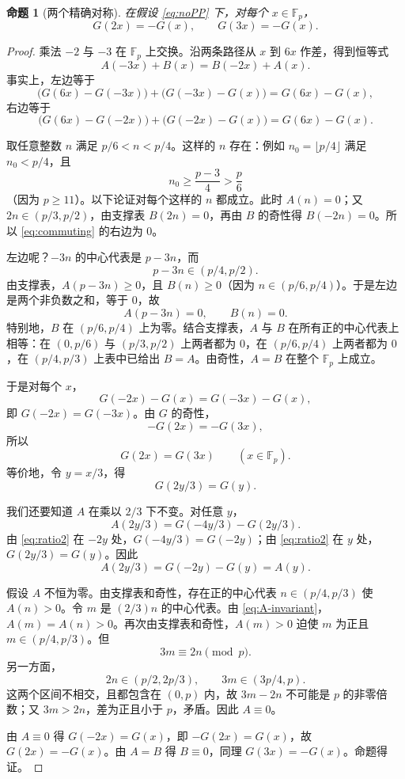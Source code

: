 \documentclass[11pt,a4paper]{ctexart}
\theoremstyle{plain}
\newtheorem{proposition}[theorem]{命题}
\theoremstyle{definition}
\newcommand{\Fp}{\mathbb{F}_p}
\begin{document}
\begin{proposition}[两个精确对称]
\label{prop:commuting}
在假设 \eqref{eq:noPP} 下，对每个 $x\in\Fp$，
\begin{equation}
  G(2x)=-G(x),\qquad G(3x)=-G(x).
  \label{eq:exact}
\end{equation}
\end{proposition}

\begin{proof}
乘法 $-2$ 与 $-3$ 在 $\Fp$ 上交换。沿两条路径从 $x$ 到 $6x$ 作差，得到恒等式
\begin{equation}
  A(-3x)+B(x)=B(-2x)+A(x).
  \label{eq:commuting}
\end{equation}
事实上，左边等于
\[
  \bigl(G(6x)-G(-3x)\bigr)+\bigl(G(-3x)-G(x)\bigr)=G(6x)-G(x),
\]
右边等于
\[
  \bigl(G(6x)-G(-2x)\bigr)+\bigl(G(-2x)-G(x)\bigr)=G(6x)-G(x).
\]

取任意整数 $n$ 满足 $p/6<n<p/4$。这样的 $n$ 存在：例如 $n_0=\lfloor p/4\rfloor$ 满足 $n_0<p/4$，且
\[
  n_0\ge \frac{p-3}{4}>\frac{p}{6}
\]
（因为 $p\ge11$）。以下论证对每个这样的 $n$ 都成立。此时 $A(n)=0$；又 $2n\in(p/3,p/2)$，由支撑表 $B(2n)=0$，再由 $B$ 的奇性得 $B(-2n)=0$。所以 \eqref{eq:commuting} 的右边为 $0$。

左边呢？$-3n$ 的中心代表是 $p-3n$，而
\[
  p-3n\in(p/4,p/2).
\]
由支撑表，$A(p-3n)\ge0$，且 $B(n)\ge0$（因为 $n\in(p/6,p/4)$）。于是左边是两个非负数之和，等于 $0$，故
\[
  A(p-3n)=0,\qquad B(n)=0.
\]
特别地，$B$ 在 $(p/6,p/4)$ 上为零。结合支撑表，$A$ 与 $B$ 在所有正的中心代表上相等：在 $(0,p/6)$ 与 $(p/3,p/2)$ 上两者都为 $0$，在 $(p/6,p/4)$ 上两者都为 $0$，在 $(p/4,p/3)$ 上表中已给出 $B=A$。由奇性，$A=B$ 在整个 $\Fp$ 上成立。

于是对每个 $x$，
\[
  G(-2x)-G(x)=G(-3x)-G(x),
\]
即 $G(-2x)=G(-3x)$。由 $G$ 的奇性，
\[
  -G(2x)=-G(3x),
\]
所以
\begin{equation}
  G(2x)=G(3x)\qquad(x\in\Fp).
  \label{eq:ratio}
\end{equation}
等价地，令 $y=x/3$，得
\begin{equation}
  G(2y/3)=G(y).
  \label{eq:ratio2}
\end{equation}

我们还要知道 $A$ 在乘以 $2/3$ 下不变。对任意 $y$，
\[
  A(2y/3)=G(-4y/3)-G(2y/3).
\]
由 \eqref{eq:ratio2} 在 $-2y$ 处，$G(-4y/3)=G(-2y)$；由 \eqref{eq:ratio2} 在 $y$ 处，$G(2y/3)=G(y)$。因此
\begin{equation}
  A(2y/3)=G(-2y)-G(y)=A(y).
  \label{eq:A-invariant}
\end{equation}

假设 $A$ 不恒为零。由支撑表和奇性，存在正的中心代表 $n\in(p/4,p/3)$ 使 $A(n)>0$。令 $m$ 是 $(2/3)n$ 的中心代表。由 \eqref{eq:A-invariant}，$A(m)=A(n)>0$。再次由支撑表和奇性，$A(m)>0$ 迫使 $m$ 为正且 $m\in(p/4,p/3)$。但
\[
  3m\equiv2n\pmod p.
\]
另一方面，
\[
  2n\in(p/2,2p/3),\qquad 3m\in(3p/4,p).
\]
这两个区间不相交，且都包含在 $(0,p)$ 内，故 $3m-2n$ 不可能是 $p$ 的非零倍数；又 $3m>2n$，差为正且小于 $p$，矛盾。因此 $A\equiv0$。

由 $A\equiv0$ 得 $G(-2x)=G(x)$，即 $-G(2x)=G(x)$，故 $G(2x)=-G(x)$。由 $A=B$ 得 $B\equiv0$，同理 $G(3x)=-G(x)$。命题得证。
\end{proof}
\end{document}
